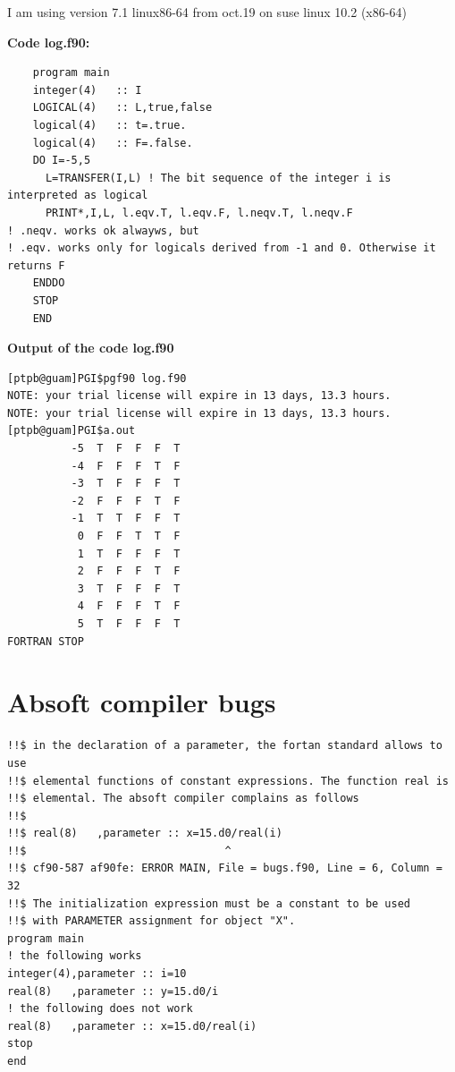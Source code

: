 \documentclass[a4paper,10pt]{report}
\begin{document}
 I am using version 7.1 linux86-64 from oct.19 on suse linux 10.2 (x86-64)

\textbf{Code log.f90:}
\begin{verbatim}
    program main
    integer(4)   :: I
    LOGICAL(4)   :: L,true,false
    logical(4)   :: t=.true.
    logical(4)   :: F=.false.
    DO I=-5,5
      L=TRANSFER(I,L) ! The bit sequence of the integer i is interpreted as logical
      PRINT*,I,L, l.eqv.T, l.eqv.F, l.neqv.T, l.neqv.F
! .neqv. works ok alwayws, but 
! .eqv. works only for logicals derived from -1 and 0. Otherwise it returns F
    ENDDO
    STOP
    END
\end{verbatim}


\textbf{Output of the code log.f90}
\begin{verbatim}
[ptpb@guam]PGI$pgf90 log.f90
NOTE: your trial license will expire in 13 days, 13.3 hours.
NOTE: your trial license will expire in 13 days, 13.3 hours.
[ptpb@guam]PGI$a.out
          -5  T  F  F  F  T
          -4  F  F  F  T  F
          -3  T  F  F  F  T
          -2  F  F  F  T  F
          -1  T  T  F  F  T
           0  F  F  T  T  F
           1  T  F  F  F  T
           2  F  F  F  T  F
           3  T  F  F  F  T
           4  F  F  F  T  F
           5  T  F  F  F  T
FORTRAN STOP
\end{verbatim}




\section{Absoft compiler bugs}

\begin{verbatim}
!!$ in the declaration of a parameter, the fortan standard allows to use
!!$ elemental functions of constant expressions. The function real is
!!$ elemental. The absoft compiler complains as follows
!!$
!!$ real(8)   ,parameter :: x=15.d0/real(i)
!!$                               ^        
!!$ cf90-587 af90fe: ERROR MAIN, File = bugs.f90, Line = 6, Column = 32 
!!$ The initialization expression must be a constant to be used 
!!$ with PARAMETER assignment for object "X".
program main
! the following works
integer(4),parameter :: i=10
real(8)   ,parameter :: y=15.d0/i
! the following does not work
real(8)   ,parameter :: x=15.d0/real(i)
stop
end
\end{verbatim}
\end{document}
